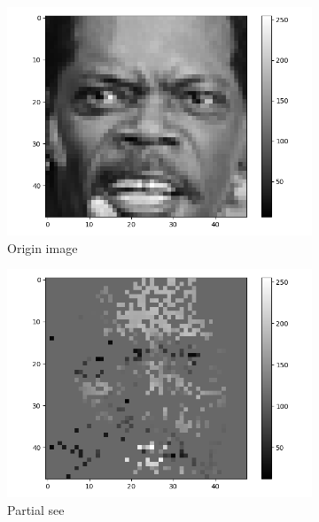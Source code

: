 \documentclass[12pt,a4paper]{extarticle}
\begin{document}
\begin{enumerate}
  \begin{figure}[ht]
    \begin{subfigure}[t]{0.32\textwidth}
      \centering
      \includegraphics[width=\linewidth]{images/origin-10.png}
      \caption{Origin image}
      \label{fig:origin-10}
    \end{subfigure}
    \begin{subfigure}[t]{0.32\textwidth}
      \centering
      \includegraphics[width=\linewidth]{images/partial-10.png}
      \caption{Partial see}
      \label{fig:partial-10}
    \end{subfigure}
    \begin{subfigure}[t]{0.32\textwidth}
      \centering

\end{subfigure}
\end{figure}
\end{enumerate}
\end{document}
